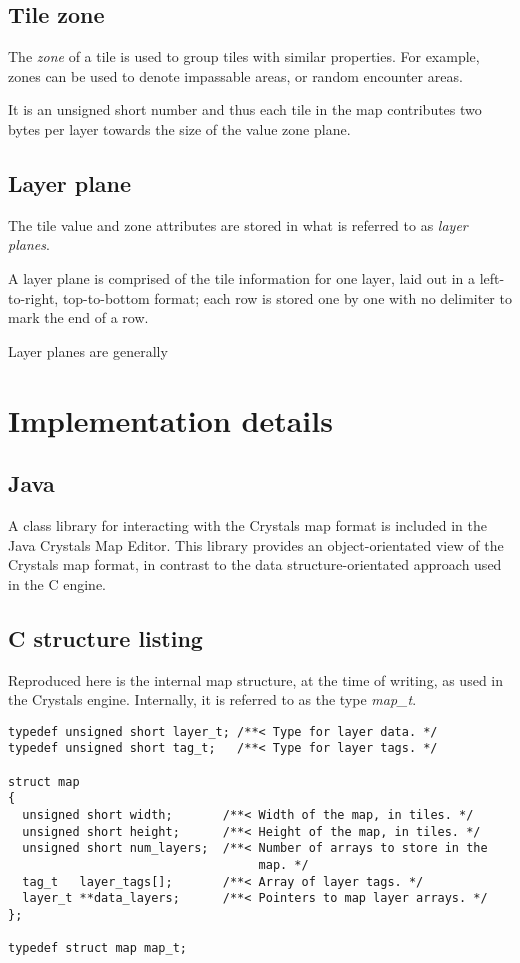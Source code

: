 \documentclass [12pt,a4paper]{article}
\begin{document}
\subsection{Tile zone}

The \emph{zone} of a tile is used to group tiles with similar
properties.  For example, zones can be used to denote impassable
areas, or random encounter areas.

It is an unsigned short number and thus each tile in the map
contributes two bytes per layer towards the size of the value zone
plane.


\subsection{Layer plane}

The tile value and zone attributes are stored in what is referred to
as \emph{layer planes}.

A layer plane is comprised of the tile information for one layer, laid
out in a left-to-right, top-to-bottom format; each row is stored one
by one with no delimiter to mark the end of a row.

Layer planes are generally 


\section{Implementation details}

\subsection{Java}

A class library for interacting with the Crystals map format is
included in the Java Crystals Map Editor.  This library provides an
object-orientated view of the Crystals map format, in contrast to the
data structure-orientated approach used in the C engine.

\subsection{C structure listing}

Reproduced here is the internal map structure, at the time of writing,
as used in the Crystals engine.  Internally, it is referred to as the
type \emph{map\_t}.


\begin{lstlisting}
typedef unsigned short layer_t; /**< Type for layer data. */
typedef unsigned short tag_t;   /**< Type for layer tags. */

struct map
{
  unsigned short width;       /**< Width of the map, in tiles. */
  unsigned short height;      /**< Height of the map, in tiles. */
  unsigned short num_layers;  /**< Number of arrays to store in the
                                   map. */
  tag_t   layer_tags[];       /**< Array of layer tags. */
  layer_t **data_layers;      /**< Pointers to map layer arrays. */
};

typedef struct map map_t;

\end{lstlisting}
\end{document}
